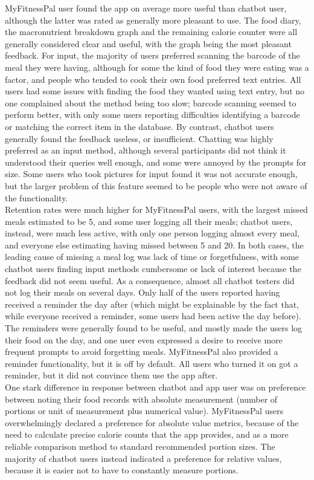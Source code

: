 MyFitnessPal user found the app on average more useful than chatbot user, although the latter was rated as generally more pleasant to use. The food diary, the macronutrient breakdown graph and the remaining calorie counter were all generally considered clear and useful, with the graph being the most pleasant feedback. For input, the majority of users preferred scanning the barcode of the meal they were having, although for some the kind of food they were eating was a factor, and people who tended to cook their own food preferred text entries. All users had some issues with finding the food they wanted using text entry, but no one complained about the method being too slow; barcode scanning seemed to perform better, with only some users reporting difficulties identifying a barcode or matching the correct item in the database. By contrast, chatbot users generally found the feedback useless, or insufficient. Chatting was highly preferred as an input method, although several participants did not think it understood their queries well enough, and some were annoyed by the prompts for size. Some users who took pictures for input found it was not accurate enough, but the larger problem of this feature seemed to be people who were not aware of the functionality. \\
Retention rates were much higher for MyFitnessPal users, with the largest missed meals estimated to be 5, and some user logging all their meals; chatbot users, instead, were much less active, with only one person logging almost every meal, and everyone else estimating having missed between 5 and 20. In both cases, the leading cause of missing a meal log was lack of time or forgetfulness, with some chatbot users finding input methods cumbersome or lack of interest because the feedback did not seem useful. As a consequence, almost all chatbot testers did not log their meals on several days. Only half of the users reported having received a reminder the day after (which might be explainable by the fact that, while everyone received a reminder, some users had been active the day before). The reminders were generally found to be useful, and mostly made the users log their food on the day, and one user even expressed a desire to receive more frequent prompts to avoid forgetting meals. MyFitnessPal also provided a reminder functionality, but it is off by default. All users who turned it on got a reminder, but it did not convince them use the app after. \\
One stark difference in response between chatbot and app user was on preference between noting their food records with absolute measurement (number of portions or unit of measurement plus numerical value). MyFitnessPal users overwhelmingly declared a preference for absolute value metrics, because of the need to calculate precise calorie counts that the app provides, and as a more reliable comparison method to standard recommended portion sizes. The majority of chatbot users instead indicated a preference for relative values, because it is easier not to have to constantly measure portions. \\
